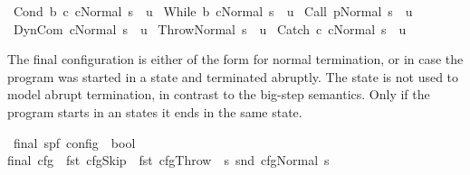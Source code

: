 \begin{isabellebody}
\ {\isachardoublequoteopen}{\isasymGamma}{\isasymturnstile}{\isacharparenleft}Cond\ b\ c{}\ c{}{\isacharcomma}Normal\ s{\isacharparenright}\ {\isasymrightarrow}\ u{\isachardoublequoteclose}\isanewline
\ {\isachardoublequoteopen}{\isasymGamma}{\isasymturnstile}{\isacharparenleft}While\ b\ c{\isacharcomma}Normal\ s{\isacharparenright}\ {\isasymrightarrow}\ u{\isachardoublequoteclose}\isanewline
\ {\isachardoublequoteopen}{\isasymGamma}{\isasymturnstile}{\isacharparenleft}Call\ p{\isacharcomma}Normal\ s{\isacharparenright}\ {\isasymrightarrow}\ u{\isachardoublequoteclose}\isanewline
\ {\isachardoublequoteopen}{\isasymGamma}{\isasymturnstile}{\isacharparenleft}DynCom\ c{\isacharcomma}Normal\ s{\isacharparenright}\ {\isasymrightarrow}\ u{\isachardoublequoteclose}\isanewline
\ {\isachardoublequoteopen}{\isasymGamma}{\isasymturnstile}{\isacharparenleft}Throw{\isacharcomma}Normal\ s{\isacharparenright}\ {\isasymrightarrow}\ u{\isachardoublequoteclose}\isanewline
\ {\isachardoublequoteopen}{\isasymGamma}{\isasymturnstile}{\isacharparenleft}Catch\ c{}\ c{}{\isacharcomma}Normal\ s{\isacharparenright}\ {\isasymrightarrow}\ u{\isachardoublequoteclose}%
\begin{isamarkuptext}%
The final configuration is either of the form  for normal
termination, or  in case the program was started in 
a  state and terminated abruptly. The  state is not used to
model abrupt termination, in contrast to the big-step semantics. Only if the
program starts in an  states it ends in the same 
state.%
\end{isamarkuptext}\isamarkuptrue%
\isamarkupfalse%
\ final{\isacharcolon}{\isacharcolon}\ {\isachardoublequoteopen}{\isacharparenleft}{\isacharprime}s{\isacharcomma}{\isacharprime}p{\isacharcomma}{\isacharprime}f{\isacharparenright}\ config\ {\isasymRightarrow}\ bool{\isachardoublequoteclose}\ \isanewline
{\isachardoublequoteopen}final\ cfg\ {\isacharequal}\ {\isacharparenleft}fst\ cfg{\isacharequal}Skip\ {\isasymor}\ {\isacharparenleft}fst\ cfg{\isacharequal}Throw\ {\isasymand}\ {\isacharparenleft}{\isasymexists}s{\isachardot}\ snd\ cfg{\isacharequal}Normal\ s{\isacharparenright}{\isacharparenright}{\isacharparenright}{\isachardoublequoteclose}\isanewline
\isanewline
\isanewline
{}\isamarkupfalse%
\ \isanewline

\end{isabellebody}
